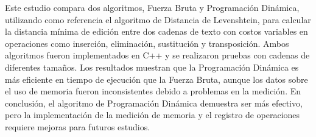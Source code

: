 Este estudio compara dos algoritmos, Fuerza Bruta y Programación Dinámica, utilizando como referencia el algoritmo de Distancia de Levenshtein, para calcular la distancia mínima de edición entre dos cadenas de texto con costos variables en operaciones como inserción, eliminación, sustitución y transposición. Ambos algoritmos fueron implementados en C++ y se realizaron pruebas con cadenas de diferentes tamaños. Los resultados muestran que la Programación Dinámica es más eficiente en tiempo de ejecución que la Fuerza Bruta, aunque los datos sobre el uso de memoria fueron inconsistentes debido a problemas en la medición. En conclusión, el algoritmo de Programación Dinámica demuestra ser más efectivo, pero la implementación de la medición de memoria y el registro de operaciones requiere mejoras para futuros estudios.